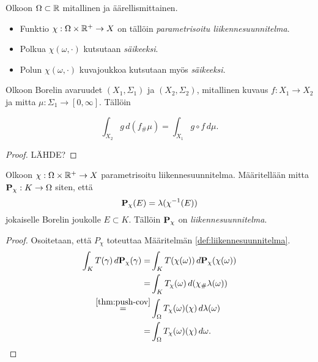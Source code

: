\begin{definition}
    Olkoon $\Omega\subset \R$ mitallinen ja äärellismittainen. 
    \begin{itemize}
        \item Funktio $\chi:\Omega \times \R^+ \to X$ on tällöin \textit{parametrisoitu liikennesuunnitelma}. \item Polkua $\chi(\omega, \cdot)$ kutsutaan \textit{säikeeksi}.
        \item Polun $\chi(\omega, \cdot)$ kuvajoukkoa kutsutaan myös \textit{säikeeksi}.
    \end{itemize}
\end{definition}

\begin{theorem}\label{thm:push-cov}
    Olkoon Borelin avaruudet $(X_1, \Sigma_1)$ ja $(X_2, \Sigma_2)$, mitallinen kuvaus $f: X_1 \to X_2$ ja mitta $\mu:\Sigma_1 \to [0, \infty]$.  Tällöin
    
    \begin{equation*}
        \int_{X_2} g \, d(f_{\#} \mu) = \int_{X_1} g \circ f \, d\mu.
    \end{equation*}
\end{theorem}
\begin{proof}
LÄHDE?
\end{proof}

\begin{theorem}
    Olkoon $\chi : \Omega \times \R^+ \to X$ parametrisoitu liikennesuunnitelma.
    Määritellään mitta $\P_\chi : K \to \Omega$ siten, että \[\P_\chi (E) = \lambda(\chi^{-1}(E))\] jokaiselle Borelin joukolle $E\subset K$. 
    Tällöin $\P_\chi$ on \textit{liikennesuunnitelma}. 
\end{theorem}

\begin{proof}
Osoitetaan, että $P_\chi$ toteuttaa Määritelmän \ref{def:liikennesuunnitelma}.
\begin{align*}
    \int_K T(\gamma)\, d\P_\chi(\gamma) = &\int_K T(\chi(\omega))\, d\P_\chi(\chi(\omega)) \\
    =& \int_K T_\chi(\omega) \, d(\chi_\# \lambda(\omega)) \\
    \stackrel{\ref{thm:push-cov}}{=}& \int_\Omega T_\chi(\omega)(\chi) \, d\lambda(\omega) \\
    =& \int_\Omega T_\chi(\omega)(\chi) \, d\omega. 
\end{align*}

\end{proof}



